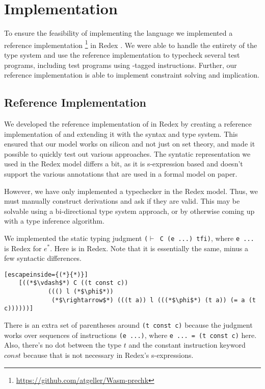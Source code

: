 \chapter{Implementation}
\label{chp:implementation}
To ensure the feasibility of implementing the \name language we implemented a reference implementation \footnote{\hyperlink{https://github.com/atgeller/Wasm-prechk}{https://github.com/atgeller/Wasm-prechk}} in Redex \cite{redex}.
We were able to handle the entirety of the type system and use the reference implementation to typecheck several test programs, including test programs using \prechk-tagged instructions.
Further, our reference implementation is able to implement constraint solving and implication.

\section{Reference Implementation}
We developed the reference implementation of \name in Redex by creating a reference implementation of \wasm and extending it with the \name syntax and type system.
This ensured that our model works on silicon and not just on set theory, and made it possible to quickly test out various approaches.
The syntatic representation we used in the Redex model differs a bit, as it is s-expression based and doesn't support the various annotations that are used in a formal model on paper.

However, we have only implemented a typechecker in the Redex model.
Thus, we must manually construct derivations and ask if they are valid.
This may be solvable using a bi-directional type system approach, or by otherwise coming up with a type inference algorithm.

We implemented the static typing judgment \texttt{($\vdash$ C (e ...) tfi)}, where \texttt{e ...} is Redex for $e^{*}$.
Here is  in Redex.
Note that it is essentially the same, minus a few syntactic differences.
\begin{lstlisting}[escapeinside={(*}{*)}]
    [((*$\vdash$*) C ((t const c))
            ((() l (*$\phi$*))
             (*$\rightarrow$*) (((t a)) l (((*$\phi$*) (t a)) (= a (t c))))))]
\end{lstlisting}
There is an extra set of parentheses around \texttt{(t const c)} because the judgment works over sequences of instructions \texttt{(e ...)}, where \texttt{e ... = (t const c)} here.
Also, there's no dot between the type $t$ and the constant instruction keyword $const$ because that is not necessary in Redex's s-expressions.

